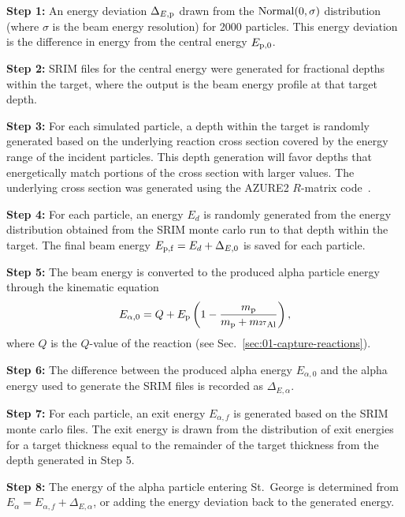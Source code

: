 \textbf{Step 1:}
  An energy deviation $\Delta_{E,\rm{p}}$ drawn from the $\rm{Normal}(0,\sigma)$
  distribution (where $\sigma$ is the beam energy resolution) for 2000
  particles. This energy deviation is the difference in energy from the central
  energy $E_{\rm{p},0}$.

\textbf{Step 2:}
  SRIM files for the central energy were generated for fractional depths
  within the target, where the output is the beam energy profile at that
  target depth.

\textbf{Step 3:}
  For each simulated particle, a depth within the target is randomly generated
  based on the underlying reaction cross section covered by the energy range of
  the incident particles. This depth generation will favor depths that
  energetically match portions of the cross section with larger values. The
  underlying cross section was generated using the AZURE2 $R$-matrix
  code~\cite{AZURE2, deBoer2017}.

\textbf{Step 4:}
  For each particle, an energy $E_d$ is randomly generated from the energy
  distribution obtained from the SRIM monte carlo run to that depth within the
  target. The final beam energy $E_{\rm{p},f} = E_d + \Delta_{E,0}$ is saved
  for each particle.

\textbf{Step 5:}
  The beam energy is converted to the produced alpha particle energy
  through the kinematic equation
  \[
      E_{\alpha,0} = Q + E_{\rm p}\left(
          1 - \frac{m_{\rm p}}{m_{\rm p} + m_{{}^{27}\rm{Al}}} %
      \right),
  \]
  where $Q$ is the $Q$-value of the reaction (see
  Sec.~\ref{sec:01-capture-reactions}).

\textbf{Step 6:}
  The difference between the produced alpha energy $E_{\alpha,0}$ and the alpha
  energy used to generate the SRIM files is recorded as $\Delta_{E,\alpha}$.

\textbf{Step 7:}
  For each particle, an exit energy $E_{\alpha,f}$ is generated based on the
  SRIM monte carlo files. The exit energy is drawn from the distribution of
  exit energies for a target thickness equal to the remainder of the target
  thickness from the depth generated in Step 5.

\textbf{Step 8:}
  The energy of the alpha particle entering St.\ George is determined from
  $E_{\alpha} = E_{\alpha,f} + \Delta_{E,\alpha}$, or adding the energy
  deviation back to the generated energy.

